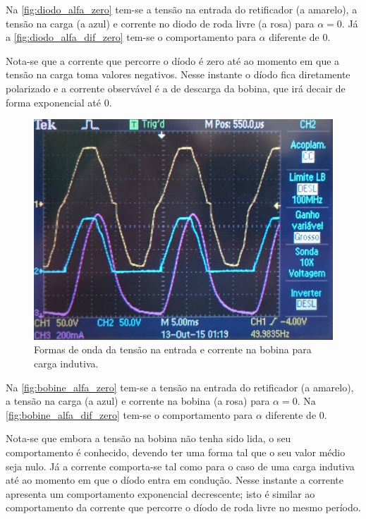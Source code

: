 \documentclass[a4paper,11pt]{article}
\numberwithin{equation}{section}
\begin{document}
Na \autoref{fig:diodo_alfa_zero} tem-se a tensão na entrada do retificador (a amarelo), a tensão na carga (a azul) e corrente no diodo de roda livre (a rosa) para $\alpha = 0$. Já a \autoref{fig:diodo_alfa_dif_zero} tem-se o comportamento para $\alpha$ diferente de $0$.

Nota-se que a corrente que percorre o díodo é zero até ao momento em que a tensão na carga toma valores negativos. Nesse instante o díodo fica diretamente polarizado e a corrente observável é a de descarga da bobina, que irá decair de forma exponencial até $0$.

\begin{figure}[h]
	\centering
	\includegraphics[keepaspectratio=true, scale=0.11]{img/figs/bobine_alfa_zero}
	\caption{Formas de onda da tensão na entrada e corrente na bobina para carga indutiva.}
	\label{fig:bobine_alfa_zero}
	\vspace{-0.8em}
\end{figure}

Na \autoref{fig:bobine_alfa_zero} tem-se a tensão na entrada do retificador (a amarelo), a tensão na carga (a azul) e corrente na bobina (a rosa) para $\alpha = 0$. Na \autoref{fig:bobine_alfa_dif_zero} tem-se o comportamento para $\alpha$ diferente de $0$.

Nota-se que embora a tensão na bobina não tenha sido lida, o seu comportamento é conhecido, devendo ter uma forma tal que o seu valor médio seja nulo. Já a corrente comporta-se tal como para o caso de uma carga indutiva até ao momento em que o díodo entra em condução. Nesse instante a corrente apresenta um comportamento exponencial decrescente; isto é similar ao comportamento da corrente que percorre o díodo de roda livre no mesmo período.
\end{document}
